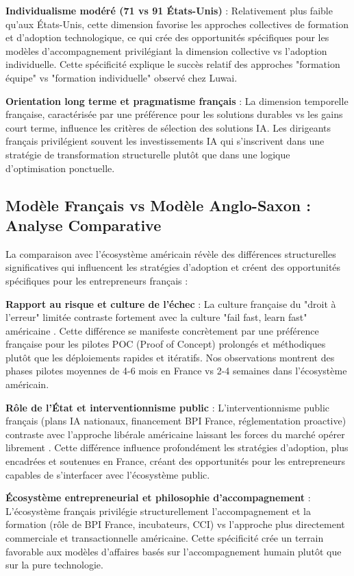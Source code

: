\textbf{Individualisme modéré (71 vs 91 États-Unis)} : Relativement plus faible qu'aux États-Unis, cette dimension favorise les approches collectives de formation et d'adoption technologique, ce qui crée des opportunités spécifiques pour les modèles d'accompagnement privilégiant la dimension collective vs l'adoption individuelle. Cette spécificité explique le succès relatif des approches "formation équipe" vs "formation individuelle" observé chez Luwai.

\textbf{Orientation long terme et pragmatisme français} : La dimension temporelle française, caractérisée par une préférence pour les solutions durables vs les gains court terme, influence les critères de sélection des solutions IA. Les dirigeants français privilégient souvent les investissements IA qui s'inscrivent dans une stratégie de transformation structurelle plutôt que dans une logique d'optimisation ponctuelle.

\subsection{Modèle Français vs Modèle Anglo-Saxon : Analyse Comparative}

La comparaison avec l'écosystème américain révèle des différences structurelles significatives qui influencent les stratégies d'adoption et créent des opportunités spécifiques pour les entrepreneurs français :

\textbf{Rapport au risque et culture de l'échec} : La culture française du "droit à l'erreur" limitée contraste fortement avec la culture "fail fast, learn fast" américaine \cite{meyer2014culture}. Cette différence se manifeste concrètement par une préférence française pour les pilotes POC (Proof of Concept) prolongés et méthodiques plutôt que les déploiements rapides et itératifs. Nos observations montrent des phases pilotes moyennes de 4-6 mois en France vs 2-4 semaines dans l'écosystème américain.

\textbf{Rôle de l'État et interventionnisme public} : L'interventionnisme public français (plans IA nationaux, financement BPI France, réglementation proactive) contraste avec l'approche libérale américaine laissant les forces du marché opérer librement \cite{france_strategie2025make}. Cette différence influence profondément les stratégies d'adoption, plus encadrées et soutenues en France, créant des opportunités pour les entrepreneurs capables de s'interfacer avec l'écosystème public.

\textbf{Écosystème entrepreneurial et philosophie d'accompagnement} : L'écosystème français privilégie structurellement l'accompagnement et la formation (rôle de BPI France, incubateurs, CCI) vs l'approche plus directement commerciale et transactionnelle américaine. Cette spécificité crée un terrain favorable aux modèles d'affaires basés sur l'accompagnement humain plutôt que sur la pure technologie.

